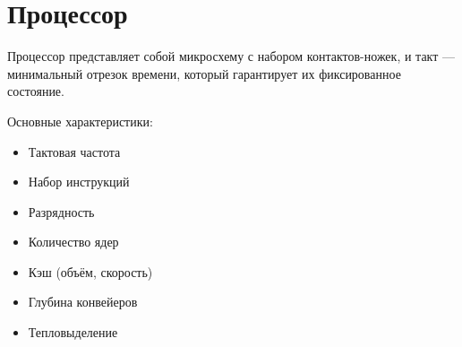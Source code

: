 \documentclass[main]{subfiles}
\begin{document}
\section{Процессор}
Процессор представляет собой микросхему с набором контактов-ножек, и такт ---
минимальный отрезок времени, который гарантирует их фиксированное состояние.

Основные характеристики:
\begin{itemize}
\item Тактовая частота
\item Набор инструкций
\item Разрядность
\item Количество ядер
\item Кэш (объём, скорость)
\item Глубина конвейеров
\item Тепловыделение
\end{itemize}
\end{document}
